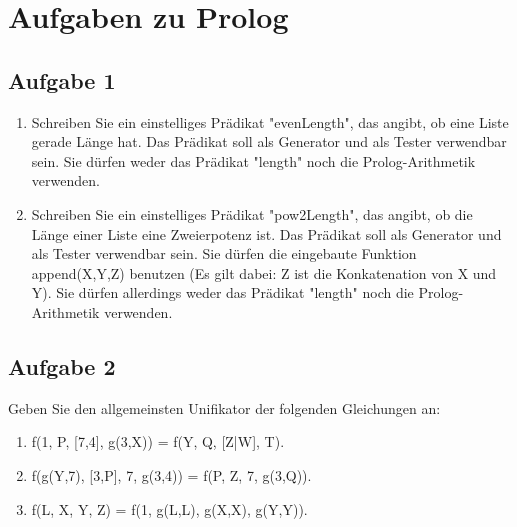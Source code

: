 \documentclass{scrartcl}
\begin{document}
\section*{Aufgaben zu Prolog}
\subsection*{Aufgabe 1}
\begin{enumerate}[1.]
\item Schreiben Sie ein einstelliges Prädikat "evenLength", das angibt, ob eine Liste gerade Länge hat. Das Prädikat soll als Generator und als Tester verwendbar sein. Sie dürfen weder das Prädikat "length" noch die Prolog-Arithmetik verwenden. 
\item Schreiben Sie ein einstelliges Prädikat "pow2Length", das angibt, ob die Länge einer Liste eine Zweierpotenz ist. Das Prädikat soll als Generator und als Tester verwendbar sein. Sie dürfen die eingebaute Funktion append(X,Y,Z) benutzen (Es gilt dabei: Z ist die Konkatenation von X und Y). Sie dürfen allerdings weder das Prädikat "length" noch die Prolog-Arithmetik verwenden. 
\end{enumerate}

\subsection*{Aufgabe 2}
Geben Sie den allgemeinsten Unifikator der folgenden Gleichungen an:
\begin{enumerate}[1.]
\item f(1, P, [7,4], g(3,X)) = f(Y, Q, [Z|W], T).
\item f(g(Y,7), [3,P], 7, g(3,4)) = f(P, Z, 7, g(3,Q)).
\item f(L, X, Y, Z) = f(1, g(L,L), g(X,X), g(Y,Y)).
\end{enumerate}
\end{document}
